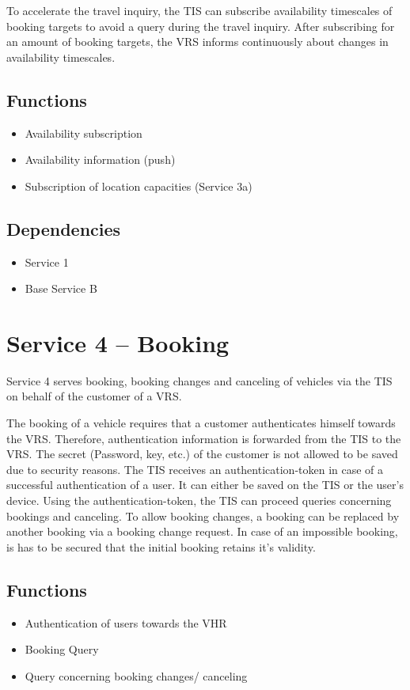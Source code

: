 To accelerate the travel inquiry, the TIS can subscribe availability timescales of booking targets to avoid a query during the travel inquiry. After subscribing for an amount of booking targets, the VRS informs continuously about changes in availability timescales. 

\subsection*{Functions}
\begin{itemize}
\item Availability subscription
\item Availability information (push)
\item Subscription of location capacities (Service 3a)
\end{itemize}

\subsection*{Dependencies}
\begin{itemize}
\item Service 1
\item Base Service B
\end{itemize}


\section{Service 4 -- Booking}
\label{sec:Hierachiemodell:Dienst4}
Service 4 serves booking, booking changes and canceling of vehicles via the TIS on behalf of the customer of a VRS.

The booking of a vehicle requires that a customer authenticates himself towards the VRS. Therefore, authentication information is forwarded from the TIS to the VRS. The secret (Password, key, etc.) of the customer is not allowed to be saved due to security reasons. The TIS receives an authentication-token in case of a successful authentication of a user. It can either be saved on the TIS or the user's device. Using the authentication-token, the TIS can proceed queries concerning bookings and canceling. 
To allow booking changes, a booking can be replaced by another booking via a booking change request. In case of an impossible booking, is has to be secured that the initial booking retains it's validity. 

\subsection*{Functions}
\begin{itemize}
\item Authentication of users towards the VHR 
\item Booking Query
\item Query concerning booking changes/ canceling
\end{itemize}

